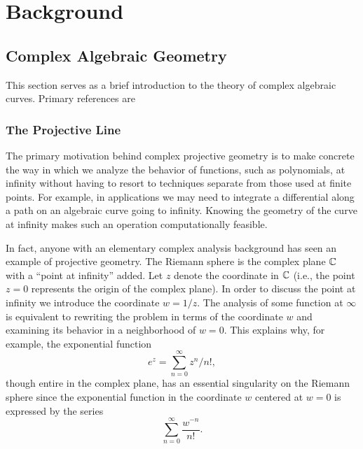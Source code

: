 \chapter{Background}\label{ch:background}

\section{Complex Algebraic Geometry}\label{sec:background-complex-algebraic-geometry}

This section serves as a brief introduction to the theory of complex algebraic
curves. Primary references are %

\subsection{The Projective Line}

The primary motivation behind complex projective geometry is to make concrete
the way in which we analyze the behavior of functions, such as polynomials, at
infinity without having to resort to techniques separate from those used at
finite points. For example, in applications we may need to integrate a
differential along a path on an algebraic curve going to infinity. Knowing the
geometry of the curve at infinity makes such an operation computationally
feasible.

In fact, anyone with an elementary complex analysis background has seen an
example of projective geometry. The Riemann sphere is the complex plane $\operatorname{\mathbb{C}}$
with a ``point at infinity'' added. Let $z$ denote the coordinate in $\operatorname{\mathbb{C}}$
(i.e., the point $z=0$ represents the origin of the complex plane). In order to
discuss the point at infinity we introduce the coordinate $w = 1/z$. The
analysis of some function at $\infty$ is equivalent to rewriting the problem in
terms of the coordinate $w$ and examining its behavior in a neighborhood of
$w=0$. This explains why, for example, the exponential function
\[
  e^z = \sum_{n=0}^\infty z^n / n!,
\]
though entire in the complex plane, has an essential singularity on the Riemann
sphere since the exponential function in the coordinate $w$ centered at $w=0$ is
expressed by the series
\[
  \sum_{n=0}^\infty \frac{w^{-n}}{n!}.
\]

